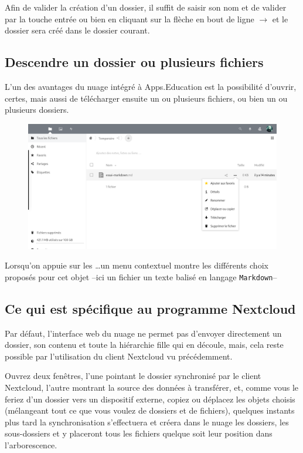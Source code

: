 Afin de valider la création d'un dossier, il suffit de saisir son nom et de valider par la touche entrée ou bien en cliquant sur la flèche en bout de ligne $\rightarrow$ et le dossier sera créé dans le dossier courant.

\subsection{Descendre un dossier ou plusieurs fichiers}
L'un des avantages du nuage intégré à Apps.Education est la possibilité d'ouvrir, certes, mais aussi de télécharger ensuite un ou plusieurs fichiers, ou bien un ou plusieurs dossiers.

\begin{figure}
	\centering
	\includegraphics{./Captures/nuage.accueil.menu.contextuel.png}
	\caption{}
\end{figure}
Lorsqu'on appuie sur les \ldots un menu contextuel montre les différents choix proposés pour cet objet --ici un fichier un texte balisé en langage \texttt{Markdown}-- 

\subsection{Ce qui est spécifique au programme Nextcloud}
Par défaut, l'interface web du nuage ne permet pas d'envoyer directement un dossier, son contenu et toute la hiérarchie fille qui en découle, mais, cela reste possible par l'utilisation du client Nextcloud vu précédemment. 

Ouvrez deux fenêtres, l'une pointant le dossier synchronisé par le client Nextcloud, l'autre montrant la source des données à transférer, et, comme vous le feriez d'un dossier vers un dispositif externe, copiez ou déplacez les objets choisis (mélangeant tout ce que vous voulez de dossiers et de fichiers), quelques instants plus tard la synchronisation s'effectuera et créera dans le nuage les dossiers, les sous-dossiers et y placeront tous les fichiers quelque soit leur position dans l'arborescence.

